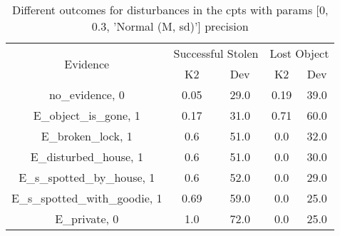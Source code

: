 \begin{table}\begin{tabular}{c|cc|cc}\toprule\multirow{2}{*}{Evidence} & \multicolumn{2}{c}{Successful Stolen} & \multicolumn{2}{c}{Lost Object} \\& {K2} & {Dev} & {K2} & {Dev} \\\midrule
no\_evidence, 0 & \cellcolor{Bittersweet}0.05&\cellcolor{Bittersweet}29.0&\cellcolor{Bittersweet}0.19&\cellcolor{Bittersweet}39.0\\E\_object\_is\_gone, 1 & \cellcolor{Bittersweet}0.17&\cellcolor{Bittersweet}31.0&\cellcolor{Bittersweet}0.71&\cellcolor{Bittersweet}60.0\\E\_broken\_lock, 1 & \cellcolor{Bittersweet}0.6&\cellcolor{Bittersweet}51.0&\cellcolor{Bittersweet}0.0&\cellcolor{Bittersweet}32.0\\E\_disturbed\_house, 1 & \cellcolor{Bittersweet}0.6&\cellcolor{Bittersweet}51.0&\cellcolor{Bittersweet}0.0&\cellcolor{Bittersweet}30.0\\E\_s\_spotted\_by\_house, 1 & \cellcolor{Bittersweet}0.6&\cellcolor{Bittersweet}52.0&\cellcolor{Bittersweet}0.0&\cellcolor{Bittersweet}29.0\\E\_s\_spotted\_with\_goodie, 1 & \cellcolor{Bittersweet}0.69&\cellcolor{Bittersweet}59.0&\cellcolor{Bittersweet}0.0&\cellcolor{Bittersweet}25.0\\E\_private, 0 & \cellcolor{Bittersweet}1.0&\cellcolor{Bittersweet}72.0&\cellcolor{Bittersweet}0.0&\cellcolor{Bittersweet}25.0\\\bottomrule\end{tabular}\caption{Different outcomes for disturbances in the cpts with params [0, 0.3, 'Normal (M, sd)'] precision}\end{table}
